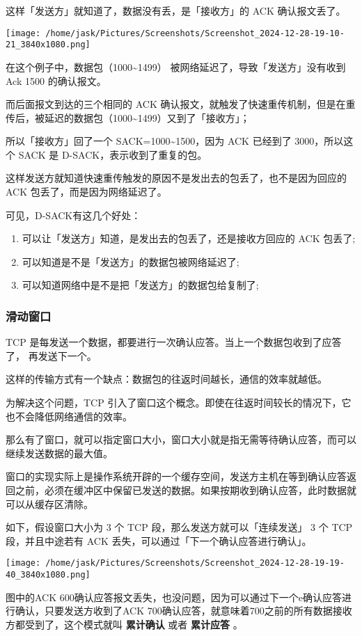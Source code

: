 \documentclass[11pt]{article}
\begin{document}
\begin{enumerate}
这样「发送方」就知道了，数据没有丢，是「接收方」的 ACK 确认报文丢了。

\begin{center}
\texttt{[image: /home/jask/Pictures/Screenshots/Screenshot\_2024-12-28-19-10-21\_3840x1080.png]}
\end{center}
在这个例子中，数据包（1000\textasciitilde{}1499） 被网络延迟了，导致「发送方」没有收到 Ack 1500 的确认报文。

而后面报文到达的三个相同的 ACK 确认报文，就触发了快速重传机制，但是在重传后，被延迟的数据包（1000\textasciitilde{}1499）又到了「接收方」；

所以「接收方」回了一个 SACK=1000\textasciitilde{}1500，因为 ACK 已经到了 3000，所以这个 SACK 是 D-SACK，表示收到了重复的包。

这样发送方就知道快速重传触发的原因不是发出去的包丢了，也不是因为回应的 ACK 包丢了，而是因为网络延迟了。

可见，D-SACK有这几个好处：

\begin{enumerate}
\item 可以让「发送方」知道，是发出去的包丢了，还是接收方回应的 ACK 包丢了;

\item 可以知道是不是「发送方」的数据包被网络延迟了;

\item 可以知道网络中是不是把「发送方」的数据包给复制了;
\end{enumerate}
\end{enumerate}
\subsubsection{滑动窗口}
\label{sec:org739e35a}
TCP 是每发送一个数据，都要进行一次确认应答。当上一个数据包收到了应答了， 再发送下一个。

这样的传输方式有一个缺点：数据包的往返时间越长，通信的效率就越低。

为解决这个问题，TCP 引入了窗口这个概念。即使在往返时间较长的情况下，它也不会降低网络通信的效率。

那么有了窗口，就可以指定窗口大小，窗口大小就是指无需等待确认应答，而可以继续发送数据的最大值。

窗口的实现实际上是操作系统开辟的一个缓存空间，发送方主机在等到确认应答返回之前，必须在缓冲区中保留已发送的数据。如果按期收到确认应答，此时数据就可以从缓存区清除。

如下，假设窗口大小为 3 个 TCP 段，那么发送方就可以「连续发送」 3 个 TCP 段，并且中途若有 ACK 丢失，可以通过「下一个确认应答进行确认」。
\begin{center}
\texttt{[image: /home/jask/Pictures/Screenshots/Screenshot\_2024-12-28-19-19-40\_3840x1080.png]}
\end{center}
图中的ACK 600确认应答报文丢失，也没问题，因为可以通过下一个e确认应答进行确认，只要发送方收到了ACK 700确认应答，就意味着700之前的所有数据接收方都受到了，这个模式就叫 \textbf{累计确认} 或者 \textbf{累计应答} 。
\end{document}
